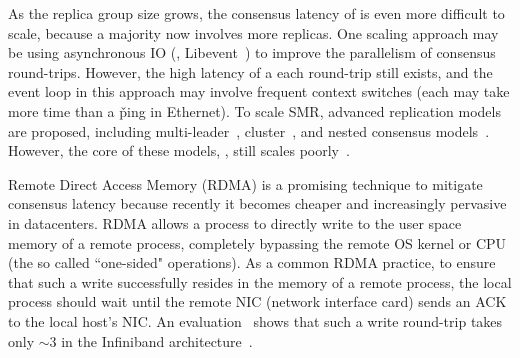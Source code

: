 
As the replica group size grows, the consensus latency of \paxos is even more 
difficult to scale, because a majority now involves more replicas. One 
scaling approach may be using asynchronous IO (\eg, 
Libevent~\cite{libevent}) to improve the parallelism of consensus round-trips. 
However, the high latency of a each round-trip still exists, and the event loop 
in this approach may involve frequent context switches (each may take more time 
than a \v{ping} in Ethernet). To scale SMR, advanced replication 
models are proposed, including multi-leader~\cite{epaxos:sosp13,mencius:osdi08}, 
cluster~\cite{manos:hotdep10}, and nested consensus 
models~\cite{scatter:sosp11}. However, the core of these models, \paxos, 
still scales poorly~\cite{ellis:thesis}.




Remote Direct Access Memory (RDMA) is a promising technique to mitigate 
consensus latency because recently it becomes cheaper and increasingly 
pervasive in datacenters. RDMA allows a process to directly write to the 
user space memory of a remote process, completely bypassing the remote OS 
kernel or CPU (the so called ``one-sided" operations). As a common 
RDMA practice, to ensure that such a write successfully resides in the 
memory of a remote process, the local process should wait until the remote NIC 
(network interface card) sends an ACK to the local host's NIC. An 
evaluation~\cite{pilaf:usenix14} shows that such a write round-trip takes only 
$\sim$3 \us in the Infiniband architecture~\cite{infiniband}.

